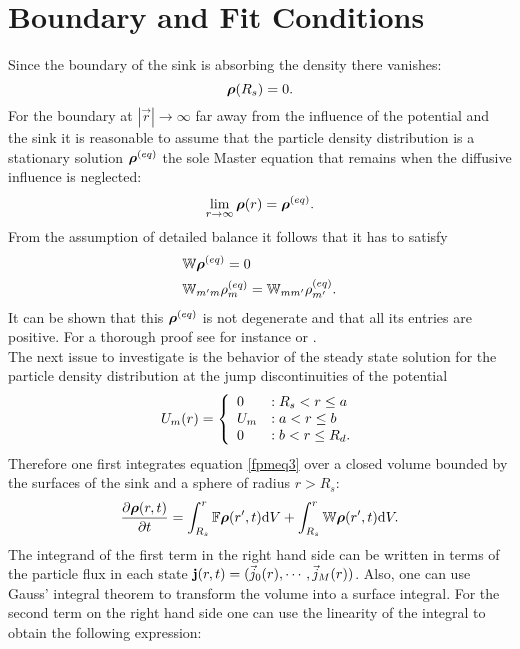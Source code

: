 \section{Boundary and Fit Conditions}
\label{Fit_Conditions}
Since the boundary of the sink is absorbing the density there vanishes:
\begin{equation}
    \boldsymbol{\mathbf{\rho}}(R_s) = 0.
    \label{bcrs}
\end{equation}
For the boundary at $|\vec{r}| \rightarrow \infty$ far away from the influence of the potential and the sink it is reasonable to assume that the particle density distribution is a stationary solution $\boldsymbol{\mathbf{\rho}}^{(eq)}$ the sole Master equation that remains when the diffusive influence is neglected:
\begin{equation}
    \lim_{r \rightarrow \infty}\boldsymbol{\mathbf{\rho}}(r) = \boldsymbol{\mathbf{\rho}}^{(eq)}.
    \label{bcinf}
\end{equation}
From the assumption of detailed balance it follows that it has to satisfy
\begin{align}
    &\mathbb{W} \boldsymbol{\mathbf{\rho}}^{(eq)} = 0 \nonumber \\
    &\mathbb{W}_{m'm} \rho_m^{(eq)} = \mathbb{W}_{mm'}\rho_{m'}^{(eq)}.
    \label{detailed_balance2}
\end{align}
It can be shown that this $\boldsymbol{\mathbf{\rho}}^{(eq)}$ is not degenerate and that all its entries are positive. For a thorough proof see for instance \cite{VanKampen1992} or \cite{Oppenheim1977}. \\
The next issue to investigate is the behavior of the steady state solution for the particle density distribution at the jump discontinuities of the potential 
\begin{equation}
  U_m(r) = \left\{ \begin{array}{l l} 
        0 &: R_s < r \le a \\
        U_m &: a<r \le b \\
        0 &: b < r \le R_d.
    \end{array} \right.
    \label{step_potential}
\end{equation}
Therefore one first integrates equation \eqref{fpmeq3} over a closed volume bounded by the surfaces of the sink and a sphere of radius $r>R_s$:
\begin{equation*}
    \frac{\partial \boldsymbol{\mathbf{\rho}}(r,t)}{\partial t} =  \int_{R_s}^{r}\mathbb{F}\boldsymbol{\mathbf{\rho}}(r',t){\rm d} V + \int_{R_s}^{r} \mathbb{W}\boldsymbol{\mathbf{\rho}}(r',t) {\rm d} V .
\end{equation*}
The integrand of the first term in the right hand side can be written in terms of the particle flux in each state $\boldsymbol{\mathbf{j}}(r,t) = (\vec{j}_{0}(r), \cdots , \vec{j}_{M}(r))$. Also, one can use Gauss' integral theorem to transform the volume into a surface integral. For the second term on the right hand side one can use the linearity of the integral to obtain the following expression:
